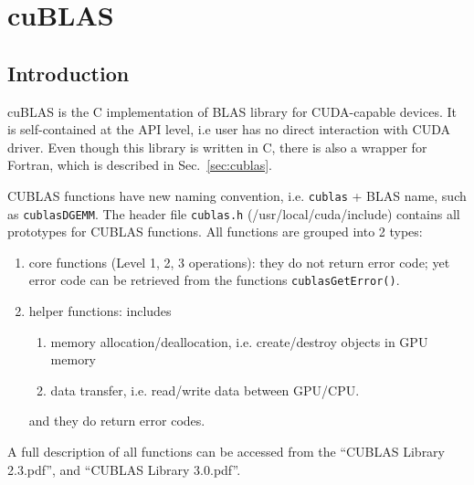 
\chapter{cuBLAS}
\label{chap:cublas}




\section{Introduction}
\label{sec:introduction}

cuBLAS is the C implementation of BLAS library for CUDA-capable
devices. It is self-contained at the API level, i.e user has no direct
interaction with CUDA driver. Even though this library is written in
C, there is also a wrapper for Fortran, which is described in
Sec.~\ref{sec:cublas}.

CUBLAS functions have new naming convention, i.e. \verb!cublas! + BLAS
name, such as \verb!cublasDGEMM!. The header file \verb!cublas.h!
(/usr/local/cuda/include) contains all prototypes for CUBLAS
functions. All functions are grouped into 2 types:
\begin{enumerate}
\item core functions (Level 1, 2, 3 operations): they do not return
  error code; yet error code can be retrieved from the functions
  \verb!cublasGetError()!.
\item helper functions: includes 
  \begin{enumerate}
  \item memory allocation/deallocation, i.e. create/destroy objects in
    GPU memory
  \item data transfer, i.e. read/write data between GPU/CPU.
  \end{enumerate}
  and they do return error codes.
\end{enumerate}
A full description of all functions can be accessed from the ``CUBLAS
Library 2.3.pdf'', and ``CUBLAS Library 3.0.pdf''.


